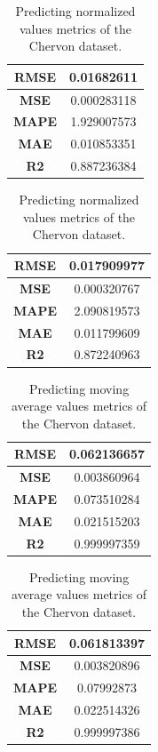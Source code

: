 \begin{table}[H]
	\centering
	\begin{minipage}{0.45\textwidth}
		\centering
		\begin{tabular}{|c|c|}
			\hline
			\textbf{RMSE} & 0.01682611  \\
			\hline
			\textbf{MSE}  & 0.000283118 \\
			\hline
			\textbf{MAPE} & 1.929007573 \\
			\hline
			\textbf{MAE}  & 0.010853351 \\
			\hline
			\textbf{R2}   & 0.887236384 \\
			\hline
		\end{tabular}
	\end{minipage}
	\begin{minipage}{0.45\textwidth}
		\centering
		\begin{tabular}{|c|c|}
			\hline
			\textbf{RMSE} & 0.017909977 \\
			\hline
			\textbf{MSE}  & 0.000320767 \\
			\hline
			\textbf{MAPE} & 2.090819573 \\
			\hline
			\textbf{MAE}  & 0.011799609 \\
			\hline
			\textbf{R2}   & 0.872240963 \\
			\hline
		\end{tabular}
	\end{minipage}
	\caption{Predicting normalized values metrics of the Chervon dataset.}
	\label{metric:che_nor}
\end{table}
\begin{table}[H]
	\centering
	\begin{minipage}{0.45\textwidth}
		\centering
		\begin{tabular}{|c|c|}
			\hline
			\textbf{RMSE} & 0.062136657 \\
			\hline
			\textbf{MSE}  & 0.003860964 \\
			\hline
			\textbf{MAPE} & 0.073510284 \\
			\hline
			\textbf{MAE}  & 0.021515203 \\
			\hline
			\textbf{R2}   & 0.999997359 \\
			\hline
		\end{tabular}
	\end{minipage}
	\begin{minipage}{0.45\textwidth}
		\centering
		\begin{tabular}{|c|c|}
			\hline
			\textbf{RMSE} & 0.061813397 \\
			\hline
			\textbf{MSE}  & 0.003820896 \\
			\hline
			\textbf{MAPE} & 0.07992873  \\
			\hline
			\textbf{MAE}  & 0.022514326 \\
			\hline
			\textbf{R2}   & 0.999997386 \\
			\hline
		\end{tabular}
	\end{minipage}
	\caption{Predicting moving average values metrics of the Chervon dataset.}
	\label{metric:che_mva}
\end{table}
